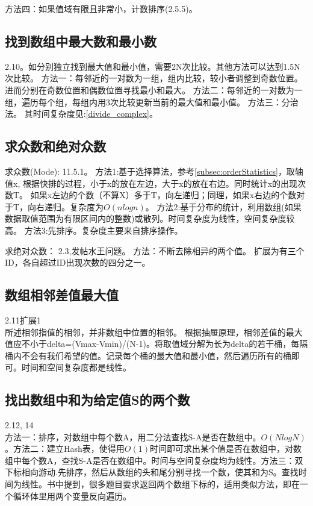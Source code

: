 方法四：如果值域有限且非常小，计数排序(\cite{bop}2.5.5)。
\subsection{找到数组中最大数和最小数}
\cite{bop}2.10。如分别独立找到最大值和最小值，需要2N次比较。其他方法可以达到1.5N次比较。
方法一：每邻近的一对数为一组，组内比较，较小者调整到奇数位置。进而分别在奇数位置和偶数位置寻找最小和最大。
方法二：每邻近的一对数为一组，遍历每个组，每组内用3次比较更新当前的最大值和最小值。
方法三：分治法。
其时间复杂度见:\ref{divide_complex}。


\subsection{求众数和绝对众数}
求众数(Mode):
\cite{pp}11.5.1。
方法1:基于选择算法，参考\ref{subsec:orderStatistics}，取轴值x, 根据快排的过程，小于x的放在左边，大于x的放在右边。同时统计x的出现次数T。 如果x左边的个数（不算X）多于T，向左递归；同理，如果x右边的个数对于T，向右递归。复杂度为$O(nlogn)$。
方法2:基于分布的统计，利用数组(如果数据取值范围为有限区间内的整数)或散列。时间复杂度为线性，空间复杂度较高。
方法3:先排序。复杂度主要来自排序操作。

求绝对众数：
\cite{bop}2.3,发帖水王问题。
方法：不断去除相异的两个值。
扩展为有三个ID，各自超过ID出现次数的四分之一。

\subsection{数组相邻差值最大值}
\cite{bop}2.11扩展1\\
所述相邻指值的相邻，并非数组中位置的相邻。
根据抽屉原理，相邻差值的最大值应不小于delta=(Vmax-Vmin)/(N-1)。将取值域分解为长为delta的若干桶，每隔桶内不会有我们希望的值。记录每个桶的最大值和最小值，然后遍历所有的桶即可。时间和空间复杂度都是线性。



\subsection{找出数组中和为给定值S的两个数}
\cite{bop}2.12, \cite{ms100}14\\
方法一：排序，对数组中每个数A，用二分法查找S-A是否在数组中。$O(NlogN)$。方法二：建立Hash表，使得用$O(1)$时间即可求出某个值是否在数组中，对数组中每个数A，查找S-A是否在数组中。时间与空间复杂度均为线性。方法三：双下标相向游动.先排序，然后从数组的头和尾分别寻找一个数，使其和为S。查找时间为线性。书中提到，很多题目要求返回两个数组下标的，适用类似方法，即在一个循环体里用两个变量反向遍历。

